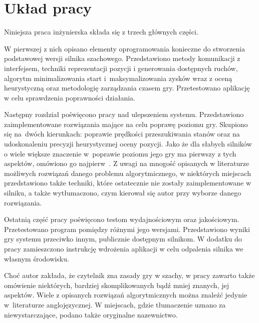 \section{Układ pracy}
\label{sec:uklad-pracy}

Niniejsza praca inżynierska składa się z trzech głównych części.

W pierwszej z nich opisano elementy oprogramowania konieczne do stworzenia podstawowej wersji silnika szachowego.
Przedstawiono metody komunikacji z interfejsem, techniki reprezentacji pozycji i generowania dostępnych ruchów, algorytm minimalizowania start i~maksymalizowania zysków wraz z oceną heurystyczną oraz metodologię zarządzania czasem gry.
Przetestowano aplikację w celu sprawdzenia poprawności działania.

Następny rozdział poświęcono pracy nad ulepszeniem systemu.
Przedstawiono zaimplementowane rozwiązania mające na celu poprawę poziomu gry.
Skupiono się na~dwóch kierunkach: poprawie prędkości przeszukiwania stanów oraz na udoskonaleniu precyzji heurystycznej oceny pozycji.
Jako że dla słabych silników o wiele większe znaczenie w~poprawie poziomu jego gry ma pierwszy z tych aspektów, omówiono go najpierw~\cite*{Vrzina2023}.
Z uwagi na mnogość opisanych w literaturze możliwych rozwiązań danego problemu algorytmicznego, w niektórych miejscach przedstawiono także techniki, które ostatecznie nie zostały zaimplementowane w silniku, a także wytłumaczono, czym kierował się autor przy wyborze danego rozwiązania.

Ostatnią część pracy poświęcono testom wydajnościowym oraz jakościowym.
Przetestowano program pomiędzy różnymi jego wersjami.
Przedstawiono wyniki gry systemu przeciwko innym, publicznie dostępnym silnikom.
W dodatku do pracy zamieszczono instrukcję wdrożenia aplikacji w celu odpalenia silnika we własnym środowisku.

Choć autor zakłada, że czytelnik zna zasady gry w szachy, w pracy zawarto także omówienie niektórych, bardziej skomplikowanych bądź mniej znanych, jej aspektów.
Wiele z opisanych rozwiązań algorytmicznych można znaleźć jedynie w~literaturze anglojęzycznej.
W miejscach, gdzie tłumaczenie uznano za niewystarczające, podano także oryginalne nazewnictwo.